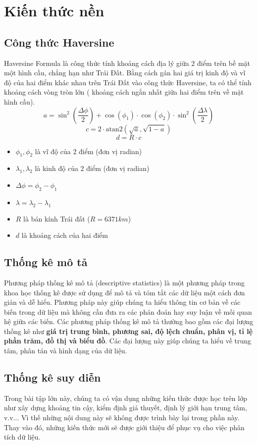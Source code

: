 \section{Kiến thức nền}\label{Kien thuc nen}
\subsection{Công thức Haversine}
Haversine Formula là công thức tính khoảng cách địa lý giữa 2 điểm trên bề mặt một hình cầu, chẳng hạn như Trái Đất. Bằng cách gán hai giá trị kinh độ và vĩ độ của hai điểm khác nhau trên Trái Đất vào công thức Haversine, ta có thể tính khoảng cách vòng tròn lớn ( khoảng cách ngắn nhất giữa hai điểm trên về mặt hình cầu).
\[
a = \sin^2\left(\frac{\Delta \phi}{2}\right) + \cos(\phi_1) \cdot \cos(\phi_2) \cdot \sin^2\left(\frac{\Delta \lambda}{2}\right)
\]
\[
c = 2 \cdot \text{atan2}\left(\sqrt{a}, \sqrt{1-a}\right)
\]
\[
d = R \cdot c
\]
\begin{itemize}
  \item \( \phi_1, \phi_2 \) là vĩ độ của 2 điểm (đơn vị radian)
  \item \( \lambda_1, \lambda_2 \) là kinh độ của 2 điểm (đơn vị radian)
  \item \( \Delta \phi = \phi_2 - \phi_1 \)
  \item \( \lambda = \lambda_2 - \lambda_1 \)
  \item \( R \) là bán kính Trái đất (\( R = 6371 km \))
  \item \( d \) là khoảng cách của hai điểm
\end{itemize}
\subsection{Thống kê mô tả}
Phương pháp thống kê mô tả (descriptive statistics) là một phương pháp trong khoa học thống kê được sử dụng để mô tả và tóm tắt các dữ liệu một cách đơn giản và dễ hiểu. Phương pháp này giúp chúng ta hiểu thông tin cơ bản về các biến trong dữ liệu mà không cần đưa ra các phán đoán hay suy luận về mối quan hệ giữa các biến. Các phương pháp thống kê mô tả thường bao gồm các đại lượng thống kê như \textbf{giá trị trung bình, phương sai, độ lệch chuẩn, phân vị, tỉ lệ phần trăm, đồ thị và biểu đồ}. Các đại lượng này giúp chúng ta hiểu về trung tâm, phân tán và hình dạng của dữ liệu.
\subsection{Thống kê suy diễn}
Trong bài tập lớn này, chúng ta có vận dụng những kiến thức được học trên lớp như xây dựng khoảng tin cậy, kiểm định giả thuyết, định lý giới hạn trung tâm, v.v... Vì thế những nội dung này sẽ không được trình bày lại trong phần này. Thay vào đó, những kiến thức mới sẽ được giới thiệu để phục vụ cho việc phân tích dữ liệu.
